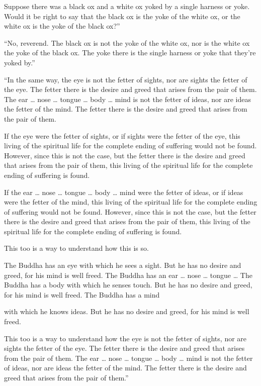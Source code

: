 \documentclass[12pt,openany]{book}%
\begin{document}
Suppose there was a black ox and a white ox yoked by a single harness or yoke. Would it be right to say that the black ox is the yoke of the white ox, or the white ox is the yoke of the black ox?” 

“No, reverend. The black ox is not the yoke of the white ox, nor is the white ox the yoke of the black ox. The yoke there is the single harness or yoke that they’re yoked by.” 

“In the same way, the eye is not the fetter of sights, nor are sights the fetter of the eye. The fetter there is the desire and greed that arises from the pair of them. The ear … nose … tongue … body … mind is not the fetter of ideas, nor are ideas the fetter of the mind. The fetter there is the desire and greed that arises from the pair of them. 

If the eye were the fetter of sights, or if sights were the fetter of the eye, this living of the spiritual life for the complete ending of suffering would not be found. However, since this is not the case, but the fetter there is the desire and greed that arises from the pair of them, this living of the spiritual life for the complete ending of suffering is found. 

If the ear … nose … tongue … body … mind were the fetter of ideas, or if ideas were the fetter of the mind, this living of the spiritual life for the complete ending of suffering would not be found. However, since this is not the case, but the fetter there is the desire and greed that arises from the pair of them, this living of the spiritual life for the complete ending of suffering is found. 

This too is a way to understand how this is so. 

The Buddha has an eye with which he sees a sight. But he has no desire and greed, for his mind is well freed. The Buddha has an ear … nose … tongue … The Buddha has a body with which he senses touch. But he has no desire and greed, for his mind is well freed. The Buddha has a mind 

with which he knows ideas. But he has no desire and greed, for his mind is well freed. 

This too is a way to understand how the eye is not the fetter of sights, nor are sights the fetter of the eye. The fetter there is the desire and greed that arises from the pair of them. The ear … nose … tongue … body … mind is not the fetter of ideas, nor are ideas the fetter of the mind. The fetter there is the desire and greed that arises from the pair of them.” 
\end{document}
